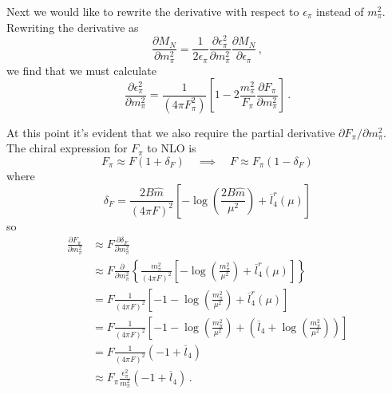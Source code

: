 \documentclass[12pt,tightenlines, raggedbottom, prd, notitlepage]{revtex4-1}
\begin{document}
Next we would like to rewrite the derivative with respect to $\epsilon_\pi$ instead of $m_\pi^2$. Rewriting the derivative as
\begin{equation}
\frac{\partial M_N}{\partial m_\pi^2} = \frac{1}{2 \epsilon_\pi} \frac{\partial \epsilon_\pi^2}{\partial m_\pi^2} \frac{\partial M_N}{\partial \epsilon_\pi}  \, ,
\end{equation}
we find that we must calculate
\begin{equation}
\frac{\partial \epsilon_\pi^2}{\partial m_\pi^2} 
= \frac{1}{(4 \pi F_\pi^2)} \left[ 1 - 2 \frac{m_\pi^2}{F_\pi} \frac{\partial F_\pi}{\partial m_\pi^2} \right] \, .
\end{equation}

At this point it's evident that we also require the partial derivative $\partial F_\pi / \partial m_\pi^2$. The chiral expression for $F_\pi$ to NLO is 
\begin{equation}
F_\pi \approx F (1 + \delta_F) \quad \implies  \quad F \approx F_\pi (1 - \delta_F)
\end{equation}
where 
\begin{equation}
\delta_F = \frac{2 B \hat m}{(4 \pi F)^2} \left[ -\log \left( \frac{2 B \hat m}{\mu^2} \right) + \overline l_4^r (\mu) \right]
\end{equation}
so 
\begin{align}
\frac{\partial F_\pi}{\partial m_\pi^2} &\approx F \frac{\partial \delta_F}{\partial m_\pi^2}
\nonumber \\
&\approx F \frac{\partial}{\partial m_\pi^2} \left\{ \frac{m_\pi^2}{(4 \pi F)^2} \left[ -\log \left( \frac{m_\pi^2}{\mu^2} \right) + \overline l_4^r (\mu) \right] \right\} 
\nonumber \\
&= F \frac{1}{(4\pi F)^2} \left[ -1 -\log \left( \frac{m_\pi^2}{\mu^2} \right)  + \overline l_4^r (\mu)  \right] 
\nonumber \\
&= F \frac{1}{(4\pi F)^2} \left[ -1 -\log \left( \frac{m_\pi^2}{\mu^2} \right)  + \left(\overline l_4 + \log \left( \frac{m_\pi^2}{\mu^2}\right) \right) \right] \nonumber \\
&= F \frac{1}{(4\pi F)^2} \left( -1 + \overline l_4 \right) \nonumber \\
&\approx F_\pi \frac{\epsilon_\pi^2}{m_\pi^2} \left( -1 + \overline l_4 \right) \, .
\end{align}
\end{document}
